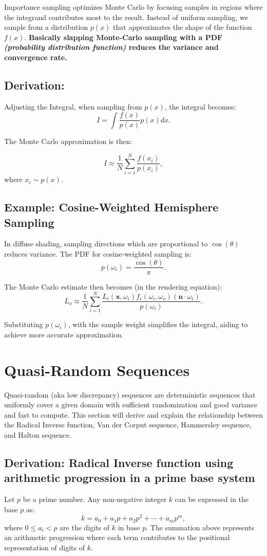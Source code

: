 \documentclass{article}
\begin{document}
	Importance sampling optimizes Monte Carlo by focusing samples in regions where the integrand contributes most to the result. Instead of uniform sampling, we sample from a distribution $p(x)$ that approximates the shape of the function $f(x)$. \textbf{Basically slapping Monte-Carlo sampling with a PDF \textit{(probability distribution function)} reduces the variance and convergence rate.}
\subsection{Derivation: }
	Adjusting the Integral, when sampling from $p(x)$, the integral becomes:
\[ 
	I = \int \frac{f(x)}{p(x)} p(x) dx. 
\]

The Monte Carlo approximation is then:

\[ 
	I \approx \frac{1}{N} \sum_{i=1}^N \frac{f(x_i)}{p(x_i)}, 
\]
where \( x_i \sim p(x) \).
\subsection{Example: Cosine-Weighted Hemisphere Sampling}
	In diffuse shading, sampling directions which are proportional to \( \cos(\theta) \) reduces variance. The PDF for cosine-weighted sampling is:
\[ 
	p(\omega_i) = \frac{\cos(\theta)}{\pi}. 
\]

The Monte Carlo estimate then becomes (in the rendering equation):
\[ 
	L_o \approx \frac{1}{N} \sum_{i=1}^N \frac{L_i(\mathbf{x}, \omega_i) f_r(\omega_i, \omega_o) (\mathbf{n} \cdot \omega_i)}{p(\omega_i)}. 
\]

Substituting \( p(\omega_i) \), with the sample weight simplifies the integral, aiding to achieve more accurate approximation.
\section{Quasi-Random Sequences}

	Quasi-random (aka low discrepancy) sequences are deterministic sequences that uniformly cover a given domain with sufficient randomization and good variance and fast to compute. This section will derive and explain the relationship between the Radical Inverse function, Van der Corput sequence, Hammersley sequence, and Halton sequence. 

\subsection{Derivation: Radical Inverse function using arithmetic progression in a prime base system}
	Let $p$ be a prime number. Any non-negative integer $k$ can be expressed in the base $p$ as:
\[
	k = a_0 + a_1 p + a_2 p^2 + \cdots + a_m p^m,
\]
where $0 \leq a_i < p$ are the digits of $k$ in base $p$. The summation above represents an arithmetic progression where each term contributes to the positional representation of digits of $k$.
\end{document}
